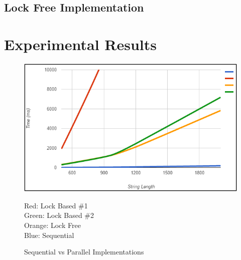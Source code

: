 \documentclass[letterpaper, 10 pt, conference]{IEEEconf}
\begin{document}
\subsection{Lock Free Implementation}



\section{Experimental Results}


\begin{figure}
\centering
\includegraphics[scale=0.6]{sequential_vs_parallel}
\caption{Sequential vs Parallel Implementations}
\medskip
\small
Red: Lock Based \#1\\ Green: Lock Based \#2\\ Orange: Lock Free\\ Blue: Sequential    
\end{figure}
\end{document}
